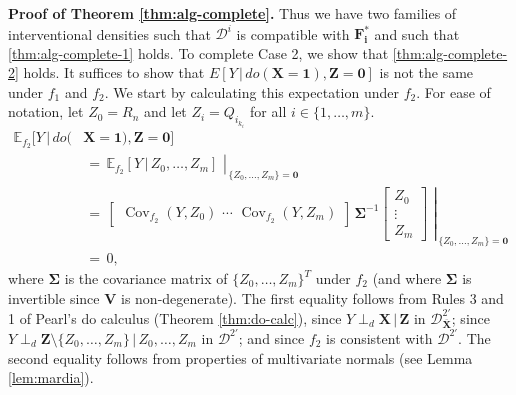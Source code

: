 \documentclass[11pt]{article}
\DeclareMathOperator{\Cov}{Cov}
\newcommand{\mb}[1]{\mathbf{#1}}
\newcommand{\dsepp}{\perp_{d}}
\newcommand{\g}[1][G]{\mathcal{#1}}
\newcommand{\E}{\mathbb{E}}
\newenvironment{proofofnoqed}[1][]{\noindent \textbf{Proof of #1.}}{}
\begin{document}
\begin{proofofnoqed}[Theorem \ref{thm:alg-complete}]
    Thus we have two families of interventional densities such that $\g[D]^i$ is compatible with $\mb{F^*_i}$ and such that \eqref{thm:alg-complete-1} holds. To complete Case 2, we show that \eqref{thm:alg-complete-2} holds. It suffices to show that $E[Y \,|\, do(\mb{X}=\mb{1}), \mb{Z}=\mb{0}]$ is not the same under $f_1$ and $f_2$. We start by calculating this expectation under $f_2$. For ease of notation, let $Z_0=R_n$ and let $Z_i = Q_{i_{k_i}}$ for all $i \in \{1, \dots, m\}$.
    \begin{align*}
        \E_{f_2}[Y \,|\, do(&\mb{X}=\mb{1}), \mb{Z} = \mb{0}]\\[.1cm]
            &\,=\, \left. \E_{f_2}[Y \,|\, Z_0, \dots, Z_m] \,\, \right\rvert_{\, \{Z_0, \dots, Z_m\}=\mb{0}}\\[-.4cm]
            &\,=\, \left. \begin{bmatrix}
                                \Cov_{f_2}(Y, Z_0) \,\, \cdots \,\, \Cov_{f_2}(Y, Z_m) 
                          \end{bmatrix} 
                          \, \mb{\Sigma}^{-1}
                          \begin{bmatrix}
                                Z_0 \\ \vdots \\ Z_m
                          \end{bmatrix} 
                          \,\, \right\rvert_{\, \{Z_0, \dots, Z_m\}=\mb{0}}\\[-.5cm]
            &\,=\, 0,
    \end{align*}
    where $\mb{\Sigma}$ is the covariance matrix of $\{Z_0, \dots, Z_m\}^T$ under $f_2$ (and where $\mb{\Sigma}$ is invertible since $\mb{V}$ is non-degenerate). The first equality follows from Rules 3 and 1 of Pearl's do calculus (Theorem \ref{thm:do-calc}), since $Y \dsepp \mb{X} \,|\, \mb{Z}$ in $\g[D]^{2'}_{\overline{\mb{X}}}$; since $Y \dsepp \mb{Z} \setminus \{Z_0, \dots, Z_m\} \,|\, Z_0, \dots, Z_m$ in $\g[D]^{2'}$; and since $f_2$ is consistent with $\g[D]^{2'}$. The second equality follows from properties of multivariate normals (see Lemma \ref{lem:mardia}).


\end{proofofnoqed}
\end{document}
